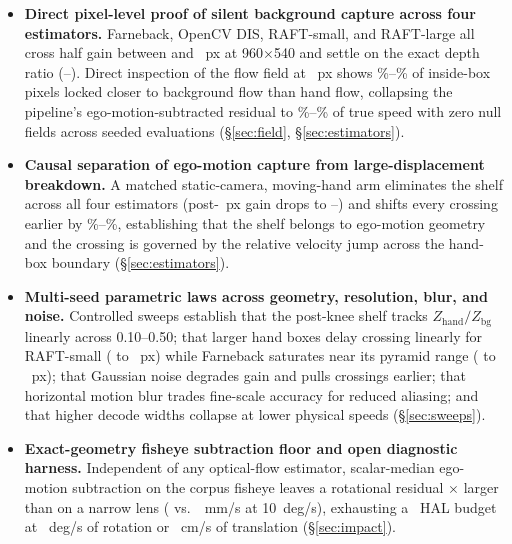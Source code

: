 \documentclass[11pt]{article}
\begin{document}
\begin{itemize}\setlength\itemsep{2pt}\setlength\parskip{0pt}
\item \textbf{Direct pixel-level proof of silent background capture across four estimators.}
Farneback, OpenCV DIS, RAFT-small, and RAFT-large all cross half gain between \cgHalfFineMean{}
and \cgHalfDisMean{}~px at 960$\times$540 and settle on the exact depth ratio
(\cgShelfRaftMean{}--\cgShelfDisMean{}). Direct inspection of the flow field at
\cgDispShelfProbe{}~px shows \cgFieldCloserBgMin{}\%--\cgFieldCloserBgMax{}\% of inside-box pixels
locked closer to background flow than hand flow, collapsing the pipeline's ego-motion-subtracted
residual to \cgFieldRecMinPct{}\%--\cgFieldRecMaxPct{}\% of true speed with zero null fields across
\cgTotalMeasurements{} seeded evaluations (\S\ref{sec:field}, \S\ref{sec:estimators}).
\item \textbf{Causal separation of ego-motion capture from large-displacement breakdown.}
A matched static-camera, moving-hand arm eliminates the \cgRatio{} shelf across all four
estimators (post-\cgDispShelfProbe{}~px gain drops to \cgStaticFloorRaftL{}--\cgStaticFloorDis{})
and shifts every crossing earlier by \cgShiftPctRaftS{}\%--\cgShiftPctRaftL{}\%, establishing that
the shelf belongs to ego-motion geometry and the crossing is governed by the relative velocity jump
across the hand-box boundary (\S\ref{sec:estimators}).
\item \textbf{Multi-seed parametric laws across geometry, resolution, blur, and noise.}
Controlled sweeps establish that the post-knee shelf tracks $Z_{\mathrm{hand}}/Z_{\mathrm{bg}}$
linearly across 0.10--0.50; that larger hand boxes delay crossing linearly for RAFT-small
(\cgBoxHalfRaftSmall{} to \cgBoxHalfRaftLarge{}~px) while Farneback saturates near its pyramid
range (\cgBoxHalfFarSmall{} to \cgBoxHalfFarLarge{}~px); that Gaussian noise degrades gain and
pulls crossings earlier; that horizontal motion blur trades fine-scale accuracy for reduced
aliasing; and that higher decode widths collapse at lower physical speeds (\S\ref{sec:sweeps}).
\item \textbf{Exact-geometry fisheye subtraction floor and open diagnostic harness.}
Independent of any optical-flow estimator, scalar-median ego-motion subtraction on the corpus
fisheye leaves a rotational residual \cgRotRatio{}$\times$ larger than on a narrow lens
(\cgRotFisheye{} vs.\ \cgRotNarrow{}~mm/s at 10~deg/s), exhausting a \cgHalBound{}~HAL budget at
\cgRotBudget{}~deg/s of rotation or \cgTransBudgetCm{}~cm/s of translation (\S\ref{sec:impact}).
\end{itemize}
\end{document}
